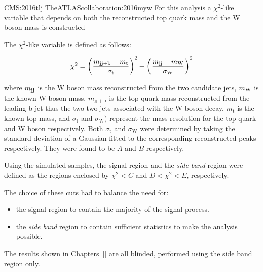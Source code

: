 CMS:2016tlj	 TheATLAScollaboration:2016myw
For this analysis a $\chi^{2}$-like variable that depends on both the reconstructed top quark mass and the W boson mass is constructed 

The $\chi^{2}$-like variable is defined as follows:

\begin{equation}\label{eq:blindingChi2}
   \chi^{2} = {\left(\frac{m_{\mathrm{jj+b}}-m_{\mathrm{t}}}{\sigma_{\mathrm{t}}}\right)}^{2} + {\left(\frac{m_{\rm jj}-m_{\rm W}}{\sigma_{\mathrm{W}}}\right)}^{2}
\end{equation}

where $m_{\rm jj}$ is the W boson mass reconstructed from the two candidate jets, $m_{\rm W}$ is the known W boson mass, $m_{\mathrm{jj+b}}$ is the top quark mass reconstructed from the leading b-jet thus the two two jets associated with the W boson decay, $m_{\mathrm{t}}$ is the known top mass, and $\sigma_{\mathrm{t}}$ and $\sigma_{\mathrm{W}})$ represent the mass resolution for the top quark and W boson respectively.
Both $\sigma_{\mathrm{t}}$ and $\sigma_{\mathrm{W}}$ were determined by taking the standard deviation of a Gaussian fitted to the corresponding reconstructed peaks respectively.
They were found to be $A$ and $B$ respectively.


Using the simulated samples, the signal region and the \emph{side band} region were defined as the regions enclosed by $\chi^{2} < C$ and $D < \chi^{2} <E $, respectively.

The choice of these cuts had to balance the need for:
\begin{itemize}
\item the signal region to contain the majority of the signal process.
\item the \emph{side band} region to contain sufficient statistics to make the analysis possible.
\end{itemize}

The results shown in Chapters~\ref{} are all blinded, \ie performed using the side band region only.
